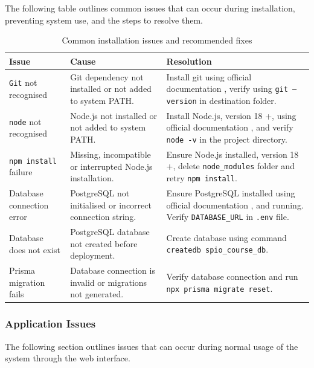 The following table outlines common issues that can occur during installation, preventing system use, and the steps to resolve them. 

\begin{table}[h]
\centering
\begin{tabularx}{\textwidth}{@{} p{2.5cm} p{5cm} X @{}}
\toprule
\textbf{Issue} & \textbf{Cause} & \textbf{Resolution} \\
\midrule

\texttt{Git} not recognised & Git dependency not installed or not added to system PATH. & Install git using official documentation \cite{git}, verify using \texttt{git --version} in destination folder. \\

\texttt{node} not recognised & Node.js not installed or not added to system PATH. & Install Node.js, version 18 +, using official documentation \cite{nodejs}, and verify \texttt{node -v} in the project directory. \\

\texttt{npm install} failure & Missing, incompatible or interrupted Node.js installation. & Ensure Node.js installed, version 18 +, delete \texttt{node\_modules} folder and retry \texttt{npm install}. \\

Database connection error & PostgreSQL not initialised or incorrect connection string. & Ensure PostgreSQL installed using official documentation \cite{postgresql}, and running. Verify \texttt{DATABASE\_URL} in \texttt{.env} file. \\

Database does not exist & PostgreSQL database not created before deployment. & Create database using command \texttt{createdb spio\_course\_db}. \\

Prisma migration fails & Database connection is invalid or migrations not generated. & Verify database connection and run \texttt{npx prisma migrate reset}. \\

\bottomrule
\end{tabularx}
\caption{Common installation issues and recommended fixes}
\end{table}
\vspace{-20pt}

\subsubsection{Application Issues}
The following section outlines issues that can occur during normal usage of the system through the web interface. 

